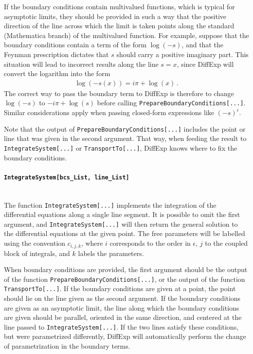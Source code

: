 \documentclass{article}
\begin{document}
If the boundary conditions contain multivalued functions, which is typical for asymptotic limits, they should be provided in such a way that the positive direction of the line across which the limit is taken points along the standard (Mathematica branch) of the multivalued function. For example, suppose that the boundary conditions contain a term of the form $\log(-s)$, and that the Feynman prescription dictates that $s$ should carry a positive imaginary part. This situation will lead to incorrect results along the line $s=x$, since DiffExp will convert the logarithm into the form
\begin{align}
    \log(-s(x)) = i \pi + \log(x)\,.
\end{align}
The correct way to pass the boundary term to DiffExp is therefore to change $\log(-s)$ to $-i \pi + \log(s)$ before calling \texttt{PrepareBoundaryConditions[...]}. Similar considerations apply when passing closed-form expressions like $(-s)^\epsilon$.

Note that the output of \texttt{PrepareBoundaryConditions[...]} includes the point or line that was given in the second argument. That way, when feeding the result to \texttt{IntegrateSystem[...]} or \texttt{TransportTo[...]}, DiffExp knows where to fix the boundary conditions.
\paragraph{\texttt{IntegrateSystem[bcs_List, line_List]}} ~\\The function \texttt{IntegrateSystem[...]} implements the integration of the differential equations along a single line segment. It is possible to omit the first argument, and \texttt{IntegrateSystem[...]} will then return the general solution to the differential equations at the given point. The free parameters will be labelled using the convention $c_{i,j,k}$, where $i$ corresponds to the order in $\epsilon$, $j$ to the coupled block of integrals, and $k$ labels the parameters.

When boundary conditions are provided, the first argument should be the output of the function \texttt{PrepareBoundaryConditions[...]}, or the output of the function \texttt{TransportTo[...]}. If the boundary conditions are given at a point, the point should lie on the line given as the second argument. If the boundary conditions are given as an asymptotic limit, the line along which the boundary conditions are given should be parallel, oriented in the same direction, and centered at the line passed to \texttt{IntegrateSystem[...]}. If the two lines satisfy these conditions, but were parametrized differently, DiffExp will automatically perform the change of parametrization in the boundary terms.
\end{document}
